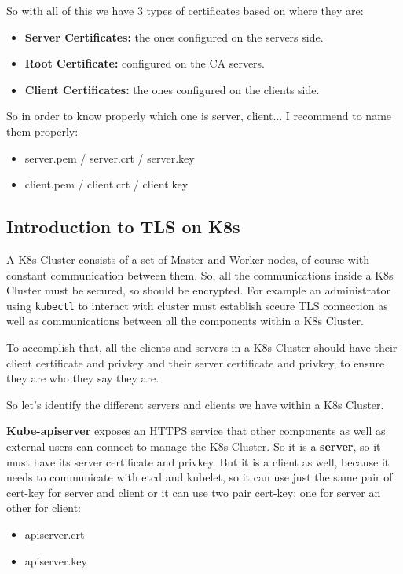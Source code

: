 \documentclass{article}
\begin{document}
So with all of this we have 3 types of certificates based on where they are:
\begin{itemize}
    \item \textbf{Server Certificates:} the ones configured on the servers side.
    \item \textbf{Root Certificate:} configured on the CA servers.
    \item \textbf{Client Certificates:} the ones configured on the clients side. 
\end{itemize}

So in order to know properly which one is server, client... I recommend to name them properly:
\begin{itemize}
    \item server.pem / server.crt / server.key 
    \item client.pem / client.crt / client.key
\end{itemize}
\subsection{Introduction to TLS on K8s}
A K8s Cluster consists of a set of Master and Worker nodes, of course with constant communication between them. So, all the communications inside a K8s Cluster must be secured, so should be encrypted.
For example an administrator using \verb|kubectl| to interact with cluster must establish sceure TLS connection as well as communications between all the components within a K8s Cluster.

To accomplish that, all the clients and servers in a K8s Cluster should have their client certificate and privkey and their server certificate and privkey, to ensure they are who they say they are.

So let's identify the different servers and clients we have within a K8s Cluster.

\textbf{Kube-apiserver} exposes an HTTPS service that other components as well as external users can connect to manage the K8s Cluster. So it is a \textbf{server}, so it must have its server certificate and privkey. But it is a client as well, because it 
needs to communicate with etcd and kubelet, so it can use just the same pair of cert-key for server and client or it can use two pair cert-key; one for server an other for client:
\begin{itemize}
    \item apiserver.crt
    \item apiserver.key
\end{itemize}
\end{document}
